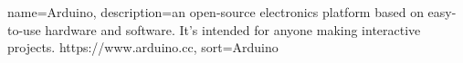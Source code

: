 %
{
  name={Arduino},
  description={an open-source electronics platform based on easy-to-use hardware and software. It's intended for anyone making interactive projects. https://www.arduino.cc},
  sort=Arduino
}
%

